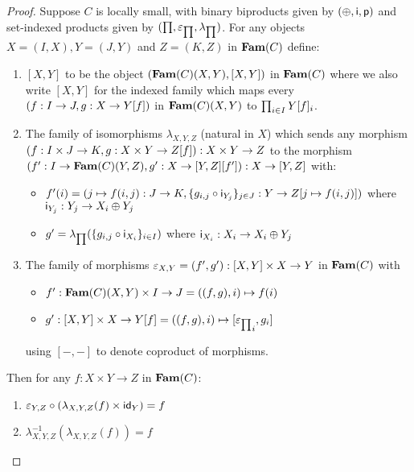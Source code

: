 \begin{proof}
Suppose $C$ is locally small, with binary biproducts given by $(\oplus,\mathsf{i},\mathsf{p})$ and set-indexed products
given by $(\prod,\varepsilon_{\prod},\lambda_{\prod})$. For any objects $X = (I, X), Y = (J, Y)$ and $Z = (K, Z)$ in
$\mathbf{Fam}(C)$ define:

\begin{enumerate}
\item $[X, Y]$ to be the object $(\mathbf{Fam}(C)(X,Y),[X, Y])$ in $\mathbf{Fam}(C)$ where we also write $[X,Y]$ for the
indexed family which maps every $(f: I \to J, g: X \to Y[f])$ in $\mathbf{Fam}(C)(X,Y)$ to $\prod_{i \in
I}Y[f]_i$.
\item The family of isomorphisms $\lambda_{X,Y,Z}$ (natural in $X$) which sends any morphism $(f: I \times J
\to K, g: X \times Y \to Z[f]): X \times Y \to Z$ to the morphism $(f': I \to \mathbf{Fam}(C)(Y,Z), g': X
\to [Y, Z][f']): X \to [Y, Z]$ with:
\begin{itemize}
\item $f'(i) = (j \mapsto f(i, j): J \to K, \{g_{i,j} \circ \mathsf{i}_{Y_j}\}_{j \in J}: Y \to Z[j
\mapsto f(i, j)])$ where $\mathsf{i}_{Y_j}: Y_j \to X_i \oplus Y_j$
\item $g' = \lambda_{\prod}(\{g_{i, j} \circ \mathsf{i}_{X_i} \}_{i \in I})$ where $\mathsf{i}_{X_i}: X_i \to X_i \oplus
Y_j$
\end{itemize}
\item The family of morphisms $\varepsilon_{X,Y} = (f', g'): [X, Y] \times X \to Y$ in $\mathbf{Fam}(C)$ with
\begin{itemize}
\item $f': \mathbf{Fam}(C)(X,Y) \times I \to J = ((f, g), i) \mapsto f(i)$
\item $g': [X, Y] \times X \to Y[f] = ((f, g), i) \mapsto [{\varepsilon_{\prod}}_i, g_i]$
\end{itemize}
using $[-,-]$ to denote coproduct of morphisms.
\end{enumerate}
Then for any $f: X \times Y \to Z$ in $\mathbf{Fam}(C)$:
\begin{enumerate}
\item $\varepsilon_{Y,Z} \circ (\lambda_{X,Y,Z}(f) \times \mathsf{id}_{Y}) = f$
\item $\lambda^{-1}_{X,Y,Z}(\lambda_{X,Y,Z}(f)) = f$
\end{enumerate}
\end{proof}
